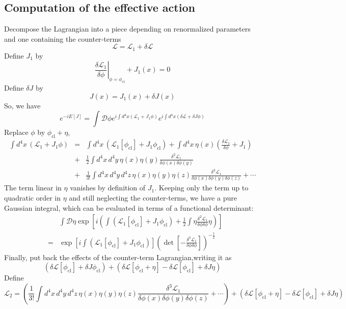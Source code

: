 \documentclass[cyan]{elegantnote}
\begin{document}
\subsection{Computation of the effective action}
\noindent
Decompose the Lagrangian into a piece depending on renormalized parameters and one containing the counter-terms
\[\mathcal{L} = \mathcal{L}_1 + \delta \mathcal{L}\]
Define $J_1$ by
\[\left. \frac{\delta \mathcal{L}_1}{\delta \phi} \right|_{\phi = \phi_{\mathrm{cl}}} + J_1(x) = 0\]
Define $\delta J$ by
\[J(x) = J_1(x) + \delta J(x)\]
So, we have
\[e^{-iE[J]} = \int \mathcal{D}\phi e^{i\int d^4x (\mathcal{L}_1 + J_1\phi)} e^{i\int d^4x (\delta \mathcal{L} + \delta J \phi)}\]
Replace $\phi$ by $\phi_{\mathrm{cl}}+\eta$,
\begin{eqnarray}
\int d^4x \, (\mathcal{L}_1 + J_1\phi) &=& \int d^4x \, (\mathcal{L}_1[\phi_{\mathrm{cl}}] + J_1\phi_{\mathrm{cl}}) + \int d^4x \, \eta(x) \left( \frac{\delta \mathcal{L}_1}{\delta \phi} + J_1 \right) \nonumber \\
&+& \frac{1}{2} \int d^4x \, d^4y \, \eta(x) \eta(y) \frac{\delta^2 \mathcal{L}_1}{\delta \phi(x) \delta \phi(y)} \nonumber \\
&+& \frac{1}{3!} \int d^4x \, d^4y \, d^4z \, \eta(x) \eta(y) \eta(z) \frac{\delta^3 \mathcal{L}_1}{\delta \phi(x) \delta \phi(y) \delta \phi(z)} + \cdots \nonumber
\end{eqnarray}
The term linear in $\eta$ vanishes by definition of $J_1$.  Keeping only the term up to quadratic order in $\eta$ and still neglecting the counter-terms, we have a pure Gaussian integral, which can be evaluated in terms of a functional determinant:
\begin{eqnarray}
&&\int \mathcal{D}\eta \exp \left[ i \left( \int ( \mathcal{L}_1 [\phi_{\mathrm{cl}}] + J_1\phi_{\mathrm{cl}} ) +  \frac{1}{2} \int \eta \frac{\delta^2 \mathcal{L}_1}{\delta \phi \delta \phi} \eta \right) \right] \nonumber \\
&=& \exp \left[ i \int ( \mathcal{L}_1 [\phi_{\mathrm{cl}}] + J_1\phi_{\mathrm{cl}} )\right] \left( \det \left[ - \frac{\delta^2 \mathcal{L}_1}{\delta \phi \delta \phi} \right] \right) ^{-\frac{1}{2}} \nonumber
\end{eqnarray}
Finally, put back the effects of the counter-term Lagrangian,writing it as
\[(\delta \mathcal{L}[\phi_{\mathrm{cl}}] + \delta J \phi_{\mathrm{cl}} ) + ( \delta \mathcal{L}[\phi_{\mathrm{cl}} + \eta] - \delta\mathcal{L} [\phi_{\mathrm{cl}}] + \delta J \eta)\]
Define
\[\mathcal{L}_2 = \left(\frac{1}{3!} \int d^4x \, d^4y \, d^4z \, \eta(x) \eta(y) \eta(z) \frac{\delta^3 \mathcal{L}_1}{\delta \phi(x) \delta \phi(y) \delta \phi(z)} + \cdots \right) + ( \delta \mathcal{L}[\phi_{\mathrm{cl}} + \eta] - \delta\mathcal{L} [\phi_{\mathrm{cl}}] + \delta J \eta)\]
\end{document}
